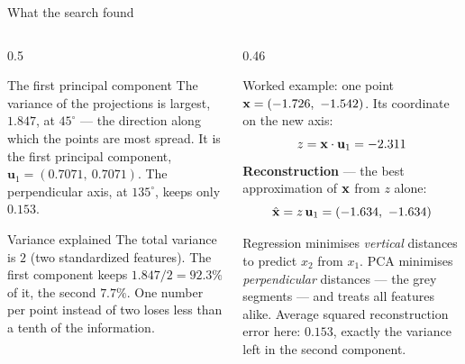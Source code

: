 \documentclass[aspectratio=169,10pt]{beamer}
\begin{document}
\begin{frame}{What the search found}
  \begin{columns}[T,onlytextwidth]
    \begin{column}{0.5\textwidth}
      \footnotesize
      \begin{block}{The first principal component}
        The variance of the projections is largest, $1.847$, at $45^\circ$ --- the
        direction along which the points are most spread. It is the first principal
        component, $\mathbf{u}_1 = (0.7071,\ 0.7071)$. The perpendicular axis, at $135^\circ$, keeps
        only $0.153$.
      \end{block}
      \begin{block}{Variance explained}
        The total variance is $2$ (two standardized features). The first component keeps
        $1.847/2 = 92.3\%$ of it, the second $7.7\%$. One number per point
        instead of two loses less than a tenth of the information.
      \end{block}
    \end{column}
    \begin{column}{0.46\textwidth}
      \footnotesize
      \begin{block}{Worked example: one point}
        $\mathbf{x} = (-1.726,\ -1.542)$. Its coordinate on the new axis:
        \[ z = \mathbf{x}\cdot\mathbf{u}_1 = -2.311 \]
        \textbf{Reconstruction} --- the best approximation of $\mathbf{x}$ from $z$ alone:
        \[ \hat{\mathbf{x}} = z\,\mathbf{u}_1 = (-1.634,\ -1.634) \]
      \end{block}
      \begin{keyidea}
        Regression minimises \emph{vertical} distances to predict $x_2$ from $x_1$. PCA
        minimises \emph{perpendicular} distances --- the grey segments --- and treats all
        features alike. Average squared reconstruction error here: $0.153$, exactly
        the variance left in the second component.
      \end{keyidea}
    \end{column}
  \end{columns}
\end{frame}
\end{document}
